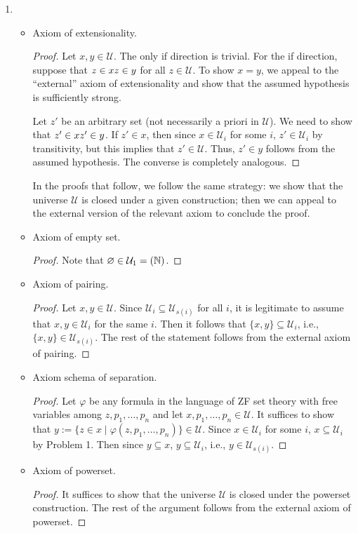 \documentclass[a4paper]{article}
\newcommand{\N}{\mathbb{N}}
\let\P\relax
\newcommand{\P}{\mathcal{P}}
\newcommand{\U}{\mathcal{U}}
\let\iff\relax
\newcommand{\iff}{\Leftrightarrow}
\begin{document}
\begin{enumerate}
\item
  \begin{itemize}
  \item Axiom of extensionality.
    \begin{proof}
      Let $x,y \in \U$.
      The only if direction is trivial.
      For the if direction, suppose that $z \in x \iff z \in y$ for all $z \in \U$.
      To show $x = y$, we appeal to the ``external'' axiom of extensionality and show that the assumed hypothesis is sufficiently strong.

      Let $z'$ be an arbitrary set (not necessarily a priori in $\U$).
      We need to show that $z' \in x \iff z' \in y$.
      If $z' \in x$, then since $x \in \U_{i}$ for some $i$, $z' \in \U_{i}$ by transitivity, but this implies that $z' \in \U$.
      Thus, $z' \in y$ follows from the assumed hypothesis.
      The converse is completely analogous.
    \end{proof}
    In the proofs that follow, we follow the same strategy: we show that the universe $\U$ is closed under a given construction; then we can appeal to the external version of the relevant axiom to conclude the proof.
  \item Axiom of empty set.
    \begin{proof}
      Note that $\varnothing \in \U_{1} = \P(\N)$.
    \end{proof}
  \item Axiom of pairing.
    \begin{proof}
      Let $x,y \in \U$.
      Since $\U_{i} \subseteq \U_{s(i)}$ for all $i$, it is legitimate to assume that $x,y \in \U_{i}$ for the same $i$.
      Then it follows that $\{x,y\} \subseteq \U_{i}$, i.e., $\{x,y\} \in \U_{s(i)}$.
      The rest of the statement follows from the external axiom of pairing.
    \end{proof}
  \item Axiom schema of separation.
    \begin{proof}
      Let $\varphi$ be any formula in the language of ZF set theory with free variables among $z,p_{1},\ldots,p_{n}$ and let $x,p_{1},\ldots,p_{n} \in \U$.
      It suffices to show that $y := \{z \in x \mid \varphi(z,p_{1},\ldots,p_{n})\} \in \U$.
      Since $x \in \U_{i}$ for some $i$, $x \subseteq \U_{i}$ by Problem 1.
      Then since $y \subseteq x$, $y \subseteq \U_{i}$, i.e., $y \in \U_{s(i)}$.
    \end{proof}
  \item Axiom of powerset.
    \begin{proof}
      It suffices to show that the universe $\U$ is closed under the powerset construction.
      The rest of the argument follows from the external axiom of powerset.


\end{proof}
\end{itemize}
\end{enumerate}
\end{document}
